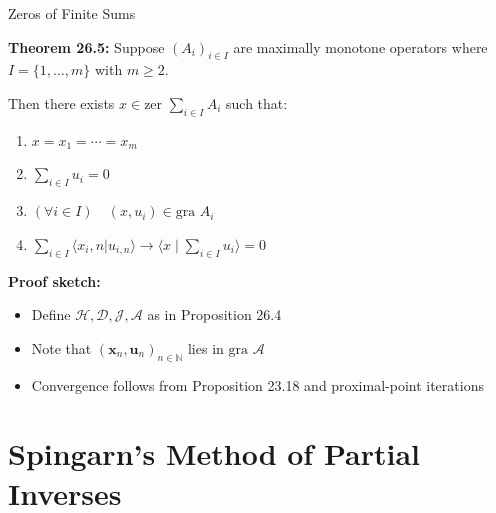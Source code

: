 \documentclass[aspectratio=169,10pt]{beamer}
\begin{document}
\begin{frame}[allowframebreaks]{Zeros of Finite Sums}

\textbf{Theorem 26.5:} Suppose $(A_i)_{i \in I}$ are maximally monotone operators where $I = \{1, \ldots, m\}$ with $m \geq 2$.

Then there exists $x \in \text{zer } \sum_{i \in I} A_i$ such that:
\begin{enumerate}
  \item[(i)] $x = x_1 = \cdots = x_m$

  \item[(ii)] $\sum_{i \in I} u_i = 0$

  \item[(iii)] $(\forall i \in I) \quad (x, u_i) \in \text{gra } A_i$

  \item[(iv)] $\sum_{i \in I} \langle x_i, n | u_{i,n} \rangle \to \langle x \mid \sum_{i \in I} u_i \rangle = 0$
\end{enumerate}

\textbf{Proof sketch:}
\begin{itemize}
  \item Define $\mathcal{H}, \mathcal{D}, \mathcal{J}, \mathcal{A}$ as in Proposition 26.4
  \item Note that $(\mathbf{x}_n, \mathbf{u}_n)_{n \in \mathbb{N}}$ lies in $\text{gra } \mathcal{A}$
  \item Convergence follows from Proposition 23.18 and proximal-point iterations
\end{itemize}

\end{frame}


\section{Spingarn's Method of Partial Inverses}
\end{document}
